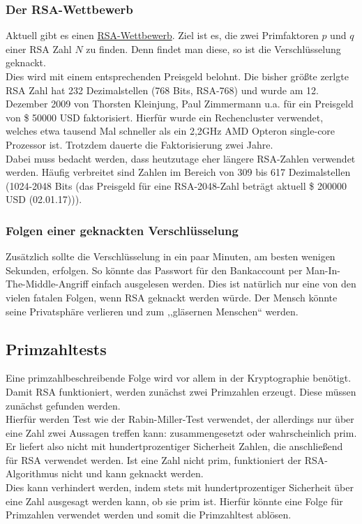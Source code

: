 \documentclass[a4paper,12pt]{article}
\begin{document}
\subsubsection{Der RSA-Wettbewerb}
Aktuell gibt es einen \href{https://en.wikipedia.org/wiki/RSA_Factoring_Challenge}{RSA-Wettbewerb}. Ziel ist es, die zwei Primfaktoren $p$ und $q$ einer RSA Zahl $N$ zu finden. Denn findet man diese, so ist die Verschlüsselung geknackt. \\Dies wird mit einem entsprechenden Preisgeld belohnt.
Die bisher größte zerlgte RSA Zahl hat 232 Dezimalstellen (768 Bits, RSA-768) und wurde am 12. Dezember 2009 von Thorsten Kleinjung, Paul Zimmermann u.a. für ein Preisgeld von \$ 50000 USD faktorisiert. Hierfür wurde ein Rechencluster verwendet, welches etwa tausend Mal schneller als ein 2,2GHz AMD Opteron single-core Prozessor ist. Trotzdem dauerte die Faktorisierung zwei Jahre.\\ 
Dabei muss bedacht werden, dass heutzutage eher längere RSA-Zahlen verwendet werden. Häufig verbreitet sind Zahlen im Bereich von 309 bis 617 Dezimalstellen (1024-2048 Bits (das Preisgeld für eine RSA-2048-Zahl beträgt aktuell \$ 200000 USD (02.01.17))).

\subsubsection{Folgen einer geknackten Verschlüsselung}
Zusätzlich sollte die Verschlüsselung in ein paar Minuten, am besten wenigen Sekunden, erfolgen. So könnte das Passwort für den Bankaccount per Man-In-The-Middle-Angriff einfach ausgelesen werden. Dies ist natürlich nur eine von den vielen fatalen Folgen, wenn RSA geknackt werden würde. Der Mensch könnte seine Privatsphäre verlieren und zum ,,gläsernen Menschen“ werden.
\subsection{Primzahltests}
Eine primzahlbeschreibende Folge wird vor allem in der Kryptographie benötigt. Damit RSA funktioniert, werden zunächst zwei Primzahlen erzeugt. Diese müssen zunächst gefunden werden.\\ Hierfür werden Test wie der Rabin-Miller-Test verwendet, der allerdings nur über eine Zahl zwei Aussagen treffen kann: zusammengesetzt oder wahrscheinlich prim. \\Er liefert also nicht mit hundertprozentiger Sicherheit Zahlen, die anschließend für RSA verwendet werden. Ist eine Zahl nicht prim, funktioniert der RSA-Algorithmus nicht und kann geknackt werden. \\
Dies kann verhindert werden, indem stets mit hundertprozentiger Sicherheit über eine Zahl ausgesagt werden kann, ob sie prim ist. Hierfür könnte eine Folge für Primzahlen verwendet werden und somit die Primzahltest ablösen.
\end{document}
